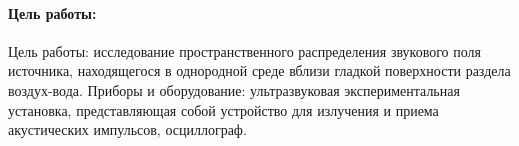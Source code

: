 

\def\labauthor{Есюнин Д.В.}
\def\labgroup{0420ДМР1Г}
\def\labtheme{Исследование динамики}

\newpage
\renewcommand{\phi}{\varphi}
\renewcommand{\div}{\text{div}}
\renewcommand{\grad}{\text{grad}}
\paragraph{Цель работы:}
Цель работы: исследование пространственного распределения звукового поля источника, находящегося в однородной среде вблизи гладкой поверхности раздела воздух-вода.
Приборы и оборудование: ультразвуковая экспериментальная установка, представляющая собой устройство для излучения и приема акустических импульсов, осциллограф.
